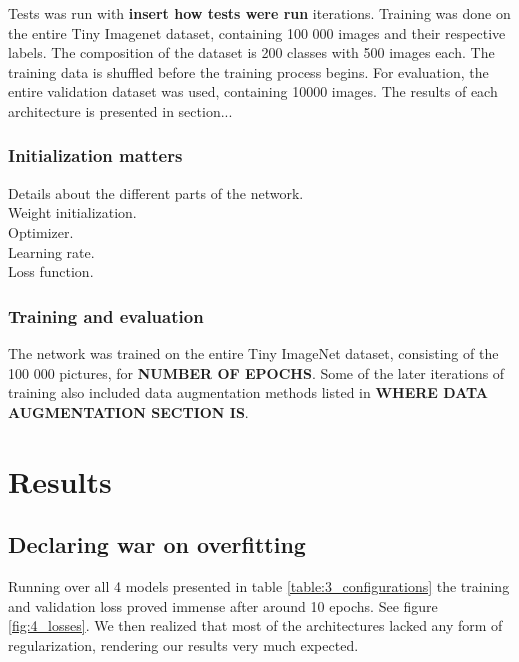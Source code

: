 \documentclass{kthreport}
\begin{document}

\FloatBarrier


\FloatBarrier


Tests was run with \textbf{insert how tests were run} iterations. Training was done on the entire Tiny Imagenet dataset, containing 100 000 images and their respective labels. The composition of the dataset is 200 classes with 500 images each. The training data is shuffled before the training process begins. For evaluation, the entire validation dataset was used, containing 10000 images. The results of each architecture is presented in section...

\subsubsection{Initialization matters}

Details about the different parts of the network.\\
Weight initialization.\\
Optimizer.\\
Learning rate.\\
Loss function.\\




\subsubsection{Training and evaluation}
The network was trained on the entire Tiny ImageNet dataset, consisting of the 100 000 pictures, for \textbf{NUMBER OF EPOCHS}. Some of the later iterations of training also included data augmentation methods listed in \textbf{WHERE DATA AUGMENTATION SECTION IS}.

\section{Results}

\subsection{Declaring war on overfitting}

Running over all 4 models presented in table \ref{table:3_configurations} the training and validation loss proved immense after around 10 epochs. See figure \ref{fig:4_losses}. We then realized that most of the architectures lacked any form of regularization, rendering our results very much expected.
\end{document}
